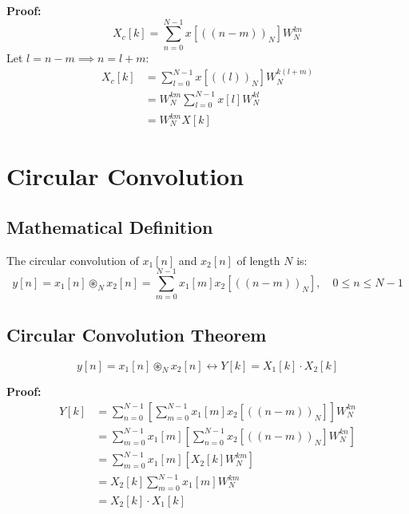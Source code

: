 \documentclass[11pt,a4paper]{article}
\begin{document}
\textbf{Proof:}
\begin{equation}
X_c[k] = \sum_{n=0}^{N-1} x[((n-m))_N] W_N^{kn}
\end{equation}
Let $l = n - m \implies n = l + m$:
\begin{align}
X_c[k] &= \sum_{l=0}^{N-1} x[((l))_N] W_N^{k(l+m)} \\
&= W_N^{km} \sum_{l=0}^{N-1} x[l] W_N^{kl} \\
&= W_N^{km} X[k]
\end{align}

\section{Circular Convolution}

\subsection{Mathematical Definition}
The circular convolution of $x_1[n]$ and $x_2[n]$ of length $N$ is:
\begin{equation}
y[n] = x_1[n] \circledast_N x_2[n] = \sum_{m=0}^{N-1} x_1[m] x_2[((n - m))_N], \quad 0 \le n \le N-1
\end{equation}

\subsection{Circular Convolution Theorem}
\begin{equation}
y[n] = x_1[n] \circledast_N x_2[n] \longleftrightarrow Y[k] = X_1[k] \cdot X_2[k]
\end{equation}

\textbf{Proof:}
\begin{align}
Y[k] &= \sum_{n=0}^{N-1} \left[ \sum_{m=0}^{N-1} x_1[m] x_2[((n - m))_N] \right] W_N^{kn} \\
&= \sum_{m=0}^{N-1} x_1[m] \left[ \sum_{n=0}^{N-1} x_2[((n - m))_N] W_N^{kn} \right] \\
&= \sum_{m=0}^{N-1} x_1[m] \left[ X_2[k] W_N^{km} \right] \\
&= X_2[k] \sum_{m=0}^{N-1} x_1[m] W_N^{km} \\
&= X_2[k] \cdot X_1[k]
\end{align}
\end{document}
